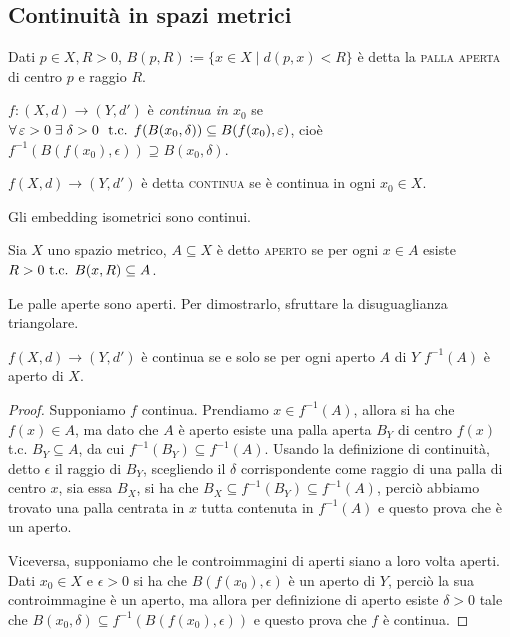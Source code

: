 \documentclass{article}
\begin{document}
\subsection{Continuità in spazi metrici}

\begin{defn}
    Dati $p \in X, R>0$, ${B(p, R):=\{ x \in X \mid d(p, x)<R\}}$ è detta la
    \textsc{palla aperta} di centro $p$ e raggio $R$.
\end{defn}

\begin{defn}
    ${f:(X, d) \rightarrow (Y, d')}$ è \textit{continua in $x_0$} se ${\forall
    \epsilon > 0 \; \exists \; \delta >0}\\\ \tc {f(B(x_0, \delta)) \subseteq
    B(f(x_0), \epsilon)}$, cioè ${f^{-1}(B(f(x_0), \epsilon)) \supseteq B(x_0,
    \delta)}$.
\end{defn}

\begin{defn}
    ${f(X, d) \rightarrow (Y, d')}$ è detta \textsc{continua} se è continua in
    ogni ${x_0 \in X}$.
\end{defn}

\begin{oss}
    Gli embedding isometrici sono continui.
\end{oss}

\begin{defn}
    Sia $X$ uno spazio metrico, $A \subseteq X$ è detto \textsc{aperto} se per
    ogni $x \in A$ esiste ${R>0 \text{ t.c. } B(x, R) \subseteq A}$.
\end{defn}

\begin{ftt}
    Le palle aperte sono aperti. Per dimostrarlo, sfruttare la disuguaglianza
    triangolare.
\end{ftt}

\begin{thm} \label{thm:cont_inv}
    $f(X, d) \rightarrow (Y, d')$ è continua se e solo se per ogni aperto $A$ di
    $Y$ $f^{-1}(A)$ è aperto di $X$.
\end{thm}

\begin{proof}
    Supponiamo $f$ continua. Prendiamo $x \in f^{-1}(A)$, allora si ha che $f(x)
    \in A$, ma dato che $A$ è aperto esiste una palla aperta $B_Y$ di centro $f(x)$
     t.c. $B_Y \subseteq A$, da cui $f^{-1}(B_Y) \subseteq f^{-1}(A)$.
    Usando la definizione di continuità, detto $\epsilon$ il raggio di $B_Y$,
    scegliendo il $\delta$ corrispondente come raggio di una palla di centro
    $x$, sia essa $B_X$, si ha che $B_X \subseteq f^{-1}(B_Y) \subseteq
    f^{-1}(A)$, perciò abbiamo trovato una palla centrata in $x$ tutta contenuta
    in $f^{-1}(A)$ e questo prova che è un aperto.

    Viceversa, supponiamo che le controimmagini di aperti siano a loro volta
    aperti. Dati $x_0 \in X$ e $\epsilon >0$ si ha che $B(f(x_0), \epsilon)$ è
    un aperto di $Y$, perciò la sua controimmagine è un aperto, ma allora per
    definizione di aperto esiste $\delta>0$ tale che $B(x_0, \delta) \subseteq
    f^{-1}(B(f(x_0), \epsilon))$ e questo prova che $f$ è continua.
\end{proof}
\end{document}
